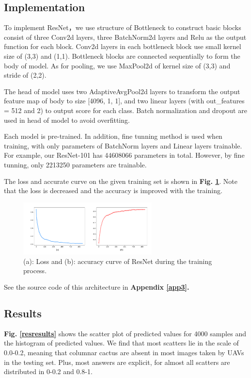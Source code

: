 \documentclass[10pt,twocolumn,letterpaper]{article}
\begin{document}
\subsection{Implementation}

To implement \textsf{ResNet}，we use structure of Bottleneck to construct basic blocks  consist of three Conv2d layers, three BatchNorm2d layers and Relu as the output function for each block. Conv2d layers in each bottleneck block use small kernel size of (3,3) and (1,1). Bottleneck blocks are connected sequentially to form the body of model. As for pooling, we use MaxPool2d of kernel size of (3,3) and stride of (2,2). 

The head of model uses two AdaptiveAvgPool2d layers to transform the output feature map of body to size [4096, 1, 1], and two linear layers (with out\_features = 512 and 2) to output score for each class. Batch normalization and dropout are used in head of model to avoid overfitting.

Each model is pre-trained. In addition, fine tunning method is used when training, with only parameters of BatchNorm layers and Linear layers trainable. For example, our \textsf{ResNet-101} has 44608066 parameters in total. However, by fine tunning, only 2213250 parameters are trainable.

The loss and accurate curve on the given training set is shown in \textbf{Fig. \ref{resacc}}. Note that the loss is decreased and the accuracy is improved with the training.

\begin{figure}[h]
\centering
\includegraphics[width=7cm]{res_acc.pdf}
\caption{(a): Loss and (b): accuracy curve of \textsf{ResNet} during the training process.}
\label{resacc}
\end{figure}

See the source code of this architecture in \textbf{Appendix \ref{app3}.}

\subsection{Results}

\textbf{Fig. \ref{resresults}} shows the scatter plot of predicted values for 4000 samples and the histogram of predicted values. We find that most scatters lie in the scale of 0.0-0.2, meaning that columnar cactus are absent in most images taken by UAVs in the testing set. Plus, most answers are explicit, for almost all scatters are distributed in 0-0.2 and 0.8-1.
\end{document}
